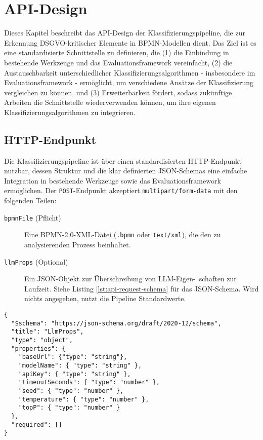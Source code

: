 \section{API-Design}\label{sec:api-design}

Dieses Kapitel beschreibt das API-Design der Klassifizierungspipeline, die zur Erkennung \ac{DSGVO}-kritischer Elemente in \ac{BPMN}-Modellen dient. Das Ziel ist es eine standardisierte Schnittstelle zu definieren, die (1) die Einbindung in bestehende Werkzeuge und das Evaluationsframework vereinfacht, (2) die Austauschbarkeit unterschiedlicher Klassifizierungsalgorithmen - insbesondere im Evaluationsframework - ermöglicht, um verschiedene Ansätze der Klassifizierung vergleichen zu können, und (3) Erweiterbarkeit fördert, sodass zukünftige Arbeiten die Schnittstelle wiederverwenden können, um ihre eigenen Klassifizierungsalgorithmen zu integrieren.

\subsection*{HTTP-Endpunkt}

Die Klassifizierungspipeline ist über einen standardisierten HTTP-Endpunkt nutzbar, dessen Struktur und die klar definierten JSON-Schemas eine einfache Integration in bestehende Werkzeuge sowie das Evaluationsframework ermöglichen. Der \texttt{POST}-Endpunkt akzeptiert \texttt{multipart/form-data} mit den folgenden Teilen:

\begin{description}
    \item[\texttt{bpmnFile} (Pflicht)] Eine BPMN-2.0-XML-Datei (\texttt{.bpmn} oder \texttt{text/xml}), die den zu analysierenden Prozess beinhaltet.
    \item[\texttt{llmProps} (Optional)] Ein JSON-Objekt zur Überschreibung von \ac{LLM}-Eigen-\linebreak~schaften zur Laufzeit. Siehe Listing \ref{lst:api-request-schema} für das JSON-Schema. Wird nichts angegeben, nutzt die Pipeline Standardwerte.
\end{description}

\begin{lstlisting}[caption={JSON-Schema der \texttt{llmProps}.},label={lst:api-request-schema}]
{
  "$schema": "https://json-schema.org/draft/2020-12/schema",
  "title": "LlmProps",
  "type": "object",
  "properties": {
    "baseUrl": {"type": "string"},
    "modelName": { "type": "string" },
    "apiKey": { "type": "string" },
    "timeoutSeconds": { "type": "number" },
    "seed": { "type": "number" },
    "temperature": { "type": "number" },
    "topP": { "type": "number" }
  },
  "required": []
}
\end{lstlisting}

